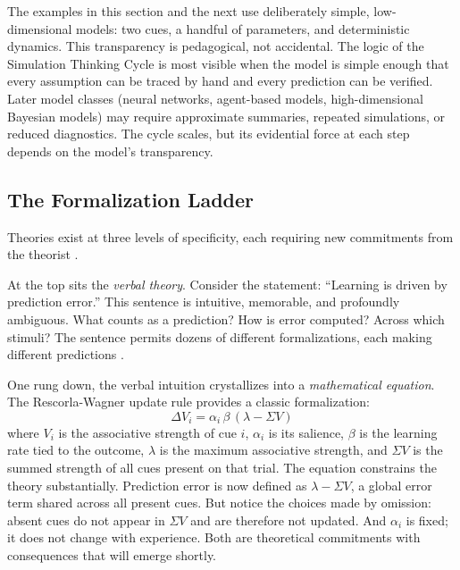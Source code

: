 \documentclass[fleqn,10pt]{wlscirep}
\begin{document}
\begin{linenumbers}
The examples in this section and the next use deliberately simple, low-dimensional models: two cues, a handful of parameters, and deterministic dynamics. This transparency is pedagogical, not accidental. The logic of the Simulation Thinking Cycle is most visible when the model is simple enough that every assumption can be traced by hand and every prediction can be verified. Later model classes (neural networks, agent-based models, high-dimensional Bayesian models) may require approximate summaries, repeated simulations, or reduced diagnostics. The cycle scales, but its evidential force at each step depends on the model's transparency.

\subsection{The Formalization Ladder}

Theories exist at three levels of specificity, each requiring new commitments from the theorist \citep{smaldino2020translate}.

At the top sits the \emph{verbal theory}. Consider the statement: ``Learning is driven by prediction error.'' This sentence is intuitive, memorable, and profoundly ambiguous. What counts as a prediction? How is error computed? Across which stimuli? The sentence permits dozens of different formalizations, each making different predictions \citep{meehl1990summaries, vanrooij2021theory}.

One rung down, the verbal intuition crystallizes into a \emph{mathematical equation}. The Rescorla-Wagner update rule \citep{rescorla1972theory} provides a classic formalization:
\begin{equation}
\Delta V_i = \alpha_i \, \beta \, (\lambda - \Sigma V)
\label{eq:rw}
\end{equation}
where $V_i$ is the associative strength of cue $i$, $\alpha_i$ is its salience, $\beta$ is the learning rate tied to the outcome, $\lambda$ is the maximum associative strength, and $\Sigma V$ is the summed strength of all cues present on that trial. The equation constrains the theory substantially. Prediction error is now defined as $\lambda - \Sigma V$, a global error term shared across all present cues. But notice the choices made by omission: absent cues do not appear in $\Sigma V$ and are therefore not updated. And $\alpha_i$ is fixed; it does not change with experience. Both are theoretical commitments with consequences that will emerge shortly.


\end{linenumbers}
\end{document}
